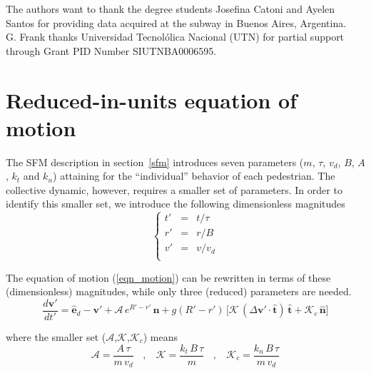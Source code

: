 \documentclass[preprint,12pt]{elsarticle}
\begin{document}
The authors want to thank the degree students Josefina Catoni and Ayelen Santos
 for providing data acquired at the subway in Buenos Aires, Argentina. \\

G. Frank thanks Universidad Tecnol\'olica Nacional (UTN) for partial
support through Grant PID Number SIUTNBA0006595.

\appendix

\section{\label{appendix1}Reduced-in-units equation of motion}

The SFM description in section~\ref{sfm} introduces seven parameters ($m$, 
$\tau$, $v_d$, $B$, $A$, $k_t$ and $k_n$) attaining for the ``individual'' 
behavior of each pedestrian. The collective dynamic, however, requires a 
smaller set of parameters. In order to identify this smaller set, we introduce 
the following dimensionless magnitudes\\

\begin{equation}
 \left\{\begin{array}{lcl}
         t' & = & t/\tau \\
         r' & = & r/B \\
         v' & = & v/v_d \\
        \end{array}\right.
\end{equation}

The equation of motion (\ref{eqn_motion}) can be rewritten in terms of these 
(dimensionless) magnitudes, while only three (reduced) parameters are needed.\\


\begin{equation}
 \displaystyle\frac{d\mathbf{v}'}{dt'}=
 \hat{\mathbf{e}}_d-\mathbf{v}'+\mathcal{A}\,e^{R'-r'}\,
 \hat{\mathbf{n}}+g(R'-r')\,\bigg[\mathcal{K}\,(\Delta\mathbf{v}'\cdot
 \hat{\mathbf{t}})\,\hat{\mathbf{t}}+\mathcal{K}_c\,\hat{\mathbf{n}}\bigg]
\end{equation}



\noindent where the smaller set ($\mathcal{A}$,$\mathcal{K}$,$\mathcal{K}_c$) 
means\\

\begin{equation}
 \mathcal{A}=\displaystyle\frac{A\,\tau}{m\,v_d}\ \ \ \ , \ \ \ \ 
 \mathcal{K}=\displaystyle\frac{k_t\,B\,\tau}{m}\ \ \ \ , \ \ \ \
 \mathcal{K}_c=\displaystyle\frac{k_n\,B\,\tau}{m\,v_d}
\end{equation}
\end{document}
